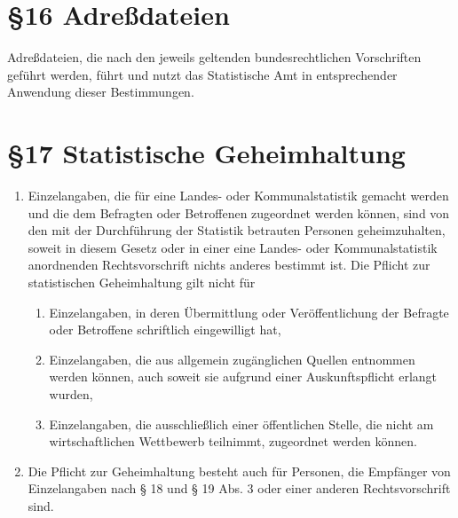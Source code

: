     \section{\S16 Adreßdateien}
    Adreßdateien, die nach den jeweils geltenden bundesrechtlichen Vorschriften geführt werden, führt und nutzt das Statistische Amt in entsprechender Anwendung dieser Bestimmungen.
    
    \section{\S17 Statistische Geheimhaltung}
        \begin{enumerate}[label=(\arabic*)]
            \item Einzelangaben, die für eine Landes- oder Kommunalstatistik gemacht werden und die dem Befragten oder Betroffenen zugeordnet werden können, sind von den mit der Durchführung der Statistik betrauten Personen geheimzuhalten, soweit in diesem Gesetz oder in einer eine Landes- oder Kommunalstatistik anordnenden Rechtsvorschrift nichts anderes bestimmt ist. Die Pflicht zur statistischen Geheimhaltung gilt nicht für
                \begin{enumerate}[label=\arabic*.]
                    \item Einzelangaben, in deren Übermittlung oder Veröffentlichung der Befragte oder Betroffene schriftlich eingewilligt hat,
                    \item Einzelangaben, die aus allgemein zugänglichen Quellen entnommen werden können, auch soweit sie aufgrund einer Auskunftspflicht erlangt wurden,
                    \item Einzelangaben, die ausschließlich einer öffentlichen Stelle, die nicht am wirtschaftlichen Wettbewerb teilnimmt, zugeordnet werden können.
                \end{enumerate}
            \item Die Pflicht zur Geheimhaltung besteht auch für Personen, die Empfänger von Einzelangaben nach § 18 und § 19 Abs. 3 oder einer anderen Rechtsvorschrift sind.
        \end{enumerate}



